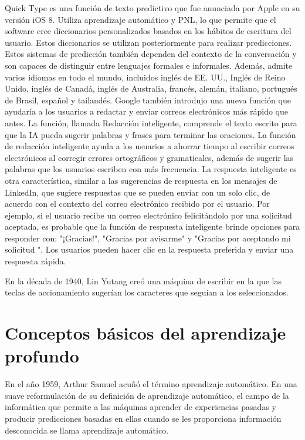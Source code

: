 Quick Type es una función de texto predictivo que fue anunciada por Apple en su versión iOS 8. Utiliza aprendizaje automático y PNL, lo que permite que el software cree diccionarios personalizados basados en los hábitos de escritura del usuario. Estos diccionarios se utilizan posteriormente para realizar predicciones. Estos sistemas de predicción también dependen del contexto de la conversación y son capaces de distinguir entre lenguajes formales e informales. Además, admite varios idiomas en todo el mundo, incluidos inglés de EE. UU., Inglés de Reino Unido, inglés de Canadá, inglés de Australia, francés, alemán, italiano, portugués de Brasil, español y tailandés.
Google también introdujo una nueva función que ayudaría a los usuarios a redactar y enviar correos electrónicos más rápido que antes. La función, llamada Redacción inteligente, comprende el texto escrito para que la IA pueda sugerir palabras y frases para terminar las oraciones. La función de redacción inteligente ayuda a los usuarios a ahorrar tiempo al escribir correos electrónicos al corregir errores ortográficos y gramaticales, además de sugerir las palabras que los usuarios escriben con más frecuencia. La respuesta inteligente es otra característica, similar a las sugerencias de respuesta en los mensajes de LinkedIn, que sugiere respuestas que se pueden enviar con un solo clic, de acuerdo con el contexto del correo electrónico recibido por el usuario. Por ejemplo, si el usuario recibe un correo electrónico felicitándolo por una solicitud aceptada, es probable que la función de respuesta inteligente brinde opciones para responder con: "¡Gracias!", "Gracias por avisarme" y "Gracias por aceptando mi solicitud ". Los usuarios pueden hacer clic en la respuesta preferida y enviar una respuesta rápida.

En la década de 1940, Lin Yutang creó una máquina de escribir en la que las teclas de accionamiento sugerían los caracteres que seguían a los seleccionados.

\section{Conceptos básicos del aprendizaje profundo}

En el año 1959, Arthur Samuel acuñó el término aprendizaje automático. En una suave reformulación de su definición de aprendizaje automático, el campo de la informática que permite a las máquinas aprender de experiencias pasadas y producir predicciones basadas en ellas cuando se les proporciona información desconocida se llama aprendizaje automático.

